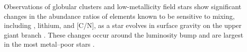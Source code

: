         




Observations of globular clusters and low-metallicity field stars show significant changes in the abundance ratios of elements known to be sensitive to mixing, including \ctwelvecthirteen, lithium, and [C/N], as a star evolves in surface gravity on the upper giant branch \citep{Carbon1982, Pilachowski1986, Kraft1994, Gratton2000, Shetrone2019}. 
These changes occur around the luminosity bump 
and are largest in the most metal--poor stars \citep[e.g.][]{Gratton2000}. 

